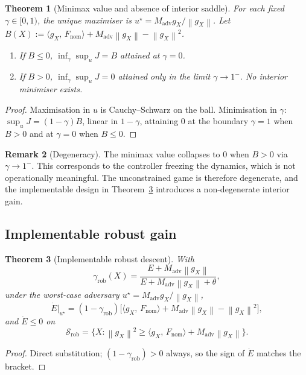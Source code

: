 \documentclass[11pt,a4paper]{article}
\newtheorem{theorem}{Theorem}[section]
\theoremstyle{definition}
\newtheorem{remark}[theorem]{Remark}
\newcommand{\norm}[1]{\left\|#1\right\|}
\newcommand{\inner}[2]{\langle #1,\,#2\rangle}
\newcommand{\rob}{\mathrm{rob}}
\newcommand{\nom}{\mathrm{nom}}
\newcommand{\adv}{\mathrm{adv}}
\begin{document}
\begin{theorem}[Minimax value and absence of interior saddle]
\label{thm:ar1}
For each fixed $\gamma \in [0,1)$, the unique maximiser is
$u^\star = M_\adv g_X / \norm{g_X}$.
Let $B(X) := \inner{g_X}{F_\nom} + M_\adv \norm{g_X} - \norm{g_X}^2$.
\begin{enumerate}[label=(\roman*)]
\item If $B \leq 0$, $\inf_{\gamma} \sup_u J = B$ attained at $\gamma = 0$.
\item If $B > 0$, $\inf_{\gamma} \sup_u J = 0$ attained only in the limit $\gamma \to 1^-$. No interior minimiser exists.
\end{enumerate}
\end{theorem}

\begin{proof}
Maximisation in $u$ is Cauchy--Schwarz on the ball. Minimisation in $\gamma$: $\sup_u J = (1-\gamma)B$, linear in $1-\gamma$, attaining $0$ at the boundary $\gamma = 1$ when $B > 0$ and at $\gamma = 0$ when $B \leq 0$.
\end{proof}

\begin{remark}[Degeneracy]
The minimax value collapses to $0$ when $B > 0$ via $\gamma \to 1^-$. This corresponds to the controller freezing the dynamics, which is not operationally meaningful. The unconstrained game is therefore degenerate, and the implementable design in Theorem~\ref{thm:ar2} introduces a non-degenerate interior gain.
\end{remark}

\subsection{Implementable robust gain}

\begin{theorem}[Implementable robust descent]
\label{thm:ar2}
With
\[
\gamma_\rob(X) = \frac{E + M_\adv \norm{g_X}}{E + M_\adv \norm{g_X} + \theta},
\]
under the worst-case adversary $u^\star = M_\adv g_X / \norm{g_X}$,
\[
\dot E\big|_{u^\star} = (1 - \gamma_\rob)\big[\inner{g_X}{F_\nom} + M_\adv \norm{g_X} - \norm{g_X}^2\big],
\]
and $\dot E \leq 0$ on
\[
\mathcal{S}_\rob = \{X : \norm{g_X}^2 \geq \inner{g_X}{F_\nom} + M_\adv \norm{g_X}\}.
\]
\end{theorem}

\begin{proof}
Direct substitution; $(1 - \gamma_\rob) > 0$ always, so the sign of $\dot E$ matches the bracket.
\end{proof}
\end{document}
